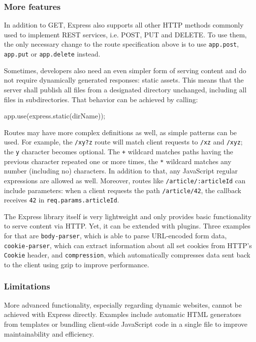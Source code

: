 \documentclass{bioinfo}
\begin{document}
\subsubsection{More features}

In addition to GET, Express also supports all other HTTP methods commonly used to implement REST services, i.e. POST, PUT and DELETE. To use them, the only necessary change to the route specification above is to use \texttt{app.post}, \texttt{app.put} or \texttt{app.delete} instead.

Sometimes, developers also need an even simpler form of serving content and do not require dynamically generated responses: static assets. This means that the server shall publish all files from a designated directory unchanged, including all files in subdirectories. That behavior can be achieved by calling:

\begin{verbatim*}
    app.use(express.static(dirName));
\end{verbatim*}

Routes may have more complex definitions as well, as simple patterns can be used. For example, the \texttt{/xy?z} route will match client requests to \texttt{/xz} and \texttt{/xyz}; the \texttt{y} character becomes optional. The \texttt{+} wildcard matches paths having the previous character repeated one or more times, the \texttt{*} wildcard matches any number (including no) characters. In addition to that, any JavaScript regular expressions are allowed as well. Moreover, routes like \texttt{/article/:articleId} can include parameters: when a client requests the path \texttt{/article/42}, the callback receives \texttt{42} in \texttt{req.params.articleId}.

The Express library itself is very lightweight and only provides basic functionality to serve content via HTTP. Yet, it can be extended with plugins. Three examples for that are \texttt{body-parser}, which is able to parse URL-encoded form data, \texttt{cookie-parser}, which can extract information about all set cookies from HTTP's \texttt{Cookie} header, and \texttt{compression}, which automatically compresses data sent back to the client using gzip to improve performance.

\subsubsection{Limitations}

More advanced functionality, especially regarding dynamic websites, cannot be achieved with Express directly. Examples include automatic HTML generators from templates or bundling client-side JavaScript code in a single file to improve maintainability and efficiency.
\end{document}
